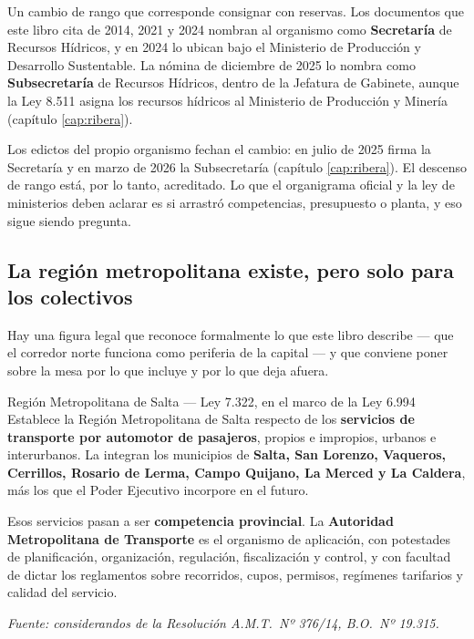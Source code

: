 \begin{cautela}
Un cambio de rango que corresponde consignar con reservas. Los documentos que este libro cita de 2014, 2021 y 2024 nombran al organismo como \textbf{Secretaría} de Recursos Hídricos, y en 2024 lo ubican bajo el Ministerio de Producción y Desarrollo Sustentable. La nómina de diciembre de 2025 lo nombra como \textbf{Subsecretaría} de Recursos Hídricos, dentro de la Jefatura de Gabinete, aunque la Ley 8.511 asigna los recursos hídricos al Ministerio de Producción y Minería (capítulo \ref{cap:ribera}).

Los edictos del propio organismo fechan el cambio: en julio de 2025 firma la Secretaría y en marzo de 2026 la Subsecretaría (capítulo \ref{cap:ribera}). El descenso de rango está, por lo tanto, acreditado. Lo que el organigrama oficial y la ley de ministerios deben aclarar es si arrastró competencias, presupuesto o planta, y eso sigue siendo pregunta.
\end{cautela}

\subsection*{La región metropolitana existe, pero solo para los colectivos}

Hay una figura legal que reconoce formalmente lo que este libro describe --- que el corredor norte funciona como periferia de la capital --- y que conviene poner sobre la mesa por lo que incluye y por lo que deja afuera.

\begin{ficha}{Región Metropolitana de Salta --- Ley 7.322, en el marco de la Ley 6.994}
Establece la Región Metropolitana de Salta respecto de los \textbf{servicios de transporte por automotor de pasajeros}, propios e impropios, urbanos e interurbanos. La integran los municipios de \textbf{Salta, San Lorenzo, Vaqueros, Cerrillos, Rosario de Lerma, Campo Quijano, La Merced y La Caldera}, más los que el Poder Ejecutivo incorpore en el futuro.

Esos servicios pasan a ser \textbf{competencia provincial}. La \textbf{Autoridad Metropolitana de Transporte} es el organismo de aplicación, con potestades de planificación, organización, regulación, fiscalización y control, y con facultad de dictar los reglamentos sobre recorridos, cupos, permisos, regímenes tarifarios y calidad del servicio.

\textit{Fuente: considerandos de la Resolución A.M.T.\ Nº 376/14, B.O.\ Nº 19.315.}
\end{ficha}


